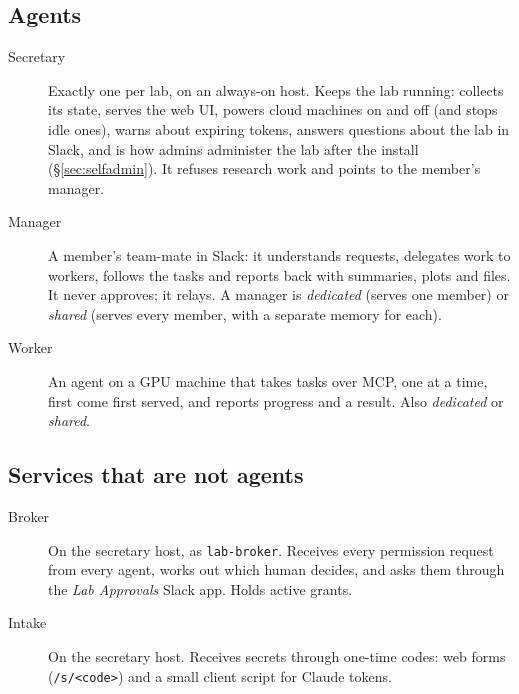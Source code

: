 \documentclass[11pt]{article}
\newcommand{\code}[1]{\texttt{#1}}
\begin{document}
\subsection{Agents}
\begin{description}
  \item[Secretary] Exactly one per lab, on an always-on host. Keeps the lab running: collects
    its state, serves the web UI, powers cloud machines on and off (and stops idle ones),
    warns about expiring tokens, answers questions about the lab in Slack, and is how
    admins administer the lab after the install (\S\ref{sec:selfadmin}). It refuses research
    work and points to the member's manager.
  \item[Manager] A member's team-mate in Slack: it understands requests, delegates work to
    workers, follows the tasks and reports back with summaries, plots and files. It never
    approves; it relays. A manager is \emph{dedicated} (serves one member) or \emph{shared}
    (serves every member, with a separate memory for each).
  \item[Worker] An agent on a GPU machine that takes tasks over MCP, one at a time, first
    come first served, and reports progress and a result. Also \emph{dedicated} or
    \emph{shared}.
\end{description}

\subsection{Services that are not agents}
\begin{description}
  \item[Broker] On the secretary host, as \code{lab-broker}. Receives every permission
    request from every agent, works out which human decides, and asks them through the
    \emph{Lab Approvals} Slack app. Holds active grants.
  \item[Intake] On the secretary host. Receives secrets through one-time codes: web forms
    (\code{/s/<code>}) and a small client script for Claude tokens.
\end{description}
\end{document}
